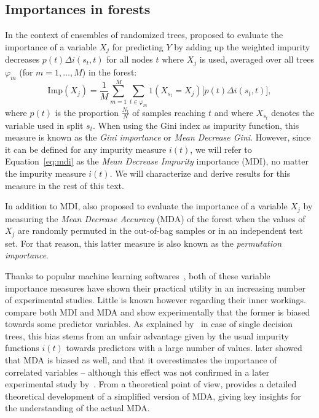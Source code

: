\subsection{Importances in forests}

In the context of ensembles of randomized trees,
\cite{breiman:2001,breiman:2002} proposed to evaluate the importance of
a variable $X_j$  for predicting  $Y$ by adding up the weighted impurity decreases $p(t) \Delta
i(s_t, t)$ for all nodes $t$ where $X_j$ is used, averaged over all trees $\varphi_m$ (for $m=1,\dots,M$)
in the forest:
\begin{equation}\label{eq:mdi}
\text{Imp}(X_j) = \frac{1}{M} \sum_{m=1}^M \sum_{t \in \varphi_{m}} 1(X_{s_t} = X_j) \Big[ p(t) \Delta i(s_t, t) \Big],
\end{equation}
where $p(t)$ is the proportion $\tfrac{N_t}{N}$ of samples
reaching $t$ and where $X_{s_t}$ denotes the variable used in split $s_t$. When
using the Gini index as impurity function, this measure is known as the
\textit{Gini importance} or \textit{Mean Decrease Gini}. However, since it can
be defined for any impurity measure $i(t)$, we will refer to Equation~\ref{eq:mdi}
as the \textit{Mean Decrease Impurity} importance (MDI), no matter the impurity
measure $i(t)$. We will characterize and derive results for this measure in the
rest of this text.

In addition to MDI, \cite{breiman:2001,breiman:2002} also proposed to evaluate
the importance of a variable $X_j$ by measuring the \textit{Mean Decrease
Accuracy} (MDA) of the forest when the values of $X_j$ are randomly permuted in
the out-of-bag samples or in an independent test set. For that reason, this
latter measure is also known as the \textit{permutation importance}.

Thanks to popular machine learning
softwares~\citep{breiman:2002,liaw:2002,pedregosa:2011},
both of these variable importance measures have shown their practical utility in
an increasing number of experimental studies. Little is known however regarding
their inner workings. \cite{strobl:2007b} compare both MDI and MDA and show
experimentally that the former is biased towards some predictor variables. As
explained by~\cite{white:1994} in case of single decision trees, this
bias stems from an unfair advantage given by the usual impurity functions $i(t)$
towards predictors with a large number of values. \cite{strobl:2008}
later showed  that MDA is biased as well, and that it overestimates the
importance of correlated variables -- although this effect was not confirmed in
a later experimental study by~\cite{genuer:2010}.  From a theoretical
point of view, \cite{ishwaran:2007} provides a detailed theoretical
development of a simplified version of MDA, giving key insights for the
understanding of the actual MDA.

